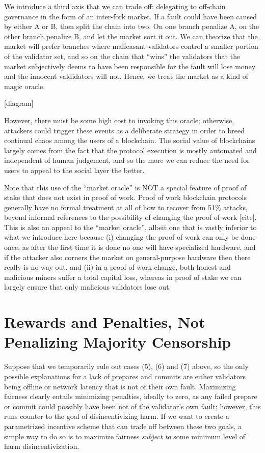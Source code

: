 \documentclass[12pt, final]{article}
\begin{document}
We introduce a third axis that we can trade off: delegating to off-chain governance in the form of an inter-fork market. If a fault could have been caused by either A or B, then split the chain into two. On one branch penalize A, on the other branch penalize B, and let the market sort it out. We can theorize that the market will prefer branches where malfeasant validators control a smaller portion of the validator set, and so on the chain that ``wins'' the validators that the market subjectively deems to have been responsible for the fault will lose money and the innocent valdidators will not. Hence, we treat the market as a kind of magic oracle.

[diagram]

However, there must be some high cost to invoking this oracle; otherwise, attackers could trigger these events as a deliberate strategy in order to breed continual chaos among the users of a blockchain. The social value of blockchains largely comes from the fact that the protocol execution is mostly automated and independent of human judgement, and so the more we can reduce the need for users to appeal to the social layer the better.

Note that this use of the ``market oracle'' is NOT a special feature of proof of stake that does not exist in proof of work. Proof of work blockchain protocols generally have no formal treatment at all of how to recover from 51\% attacks, beyond informal references to the possibility of changing the proof of work [cite]. This is also an appeal to the ``market oracle'', albeit one that is vastly inferior to what we introduce here because (i) changing the proof of work can only be done once, as after the first time it is done no one will have specialized hardware, and if the attacker also corners the market on general-purpose hardware then there really is no way out, and (ii) in a proof of work change, both honest and malicious miners suffer a total capital loss, whereas in proof of stake we can largely ensure that only malicious validators lose out.

\section{Rewards and Penalties, Not Penalizing Majority Censorship}

Suppose that we temporarily rule out cases (5), (6) and (7) above, so the only possible explanations for a lack of prepares and commits are either validators being offline or network latency that is not of their own fault. Maximizing fairness clearly entails minimizing penalties, ideally to zero, as any failed prepare or commit could possibly have been not of the validator's own fault; however, this runs counter to the goal of disincentivizing harm. If we want to create a parametrized incentive scheme that can trade off between these two goals, a simple way to do so is to maximize fairness \textit{subject to} some minimum level of harm disincentivization.
\end{document}
